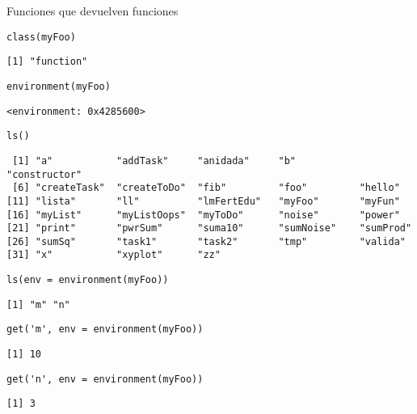 \documentclass[xcolor={usenames,svgnames,dvipsnames}]{beamer}
\begin{document}
\begin{frame}[fragile,label={sec:orgheadline18}]{Funciones que devuelven funciones}
 \lstset{language=R,label= ,caption= ,captionpos=b,numbers=none}
\begin{lstlisting}
class(myFoo)
\end{lstlisting}

\begin{verbatim}
[1] "function"
\end{verbatim}

\lstset{language=R,label= ,caption= ,captionpos=b,numbers=none}
\begin{lstlisting}
environment(myFoo)
\end{lstlisting}

\begin{verbatim}
<environment: 0x4285600>
\end{verbatim}

\lstset{language=R,label= ,caption= ,captionpos=b,numbers=none}
\begin{lstlisting}
ls()
\end{lstlisting}

\begin{verbatim}
 [1] "a"           "addTask"     "anidada"     "b"           "constructor"
 [6] "createTask"  "createToDo"  "fib"         "foo"         "hello"      
[11] "lista"       "ll"          "lmFertEdu"   "myFoo"       "myFun"      
[16] "myList"      "myListOops"  "myToDo"      "noise"       "power"      
[21] "print"       "pwrSum"      "suma10"      "sumNoise"    "sumProd"    
[26] "sumSq"       "task1"       "task2"       "tmp"         "valida"     
[31] "x"           "xyplot"      "zz"
\end{verbatim}

\lstset{language=R,label= ,caption= ,captionpos=b,numbers=none}
\begin{lstlisting}
ls(env = environment(myFoo))
\end{lstlisting}

\begin{verbatim}
[1] "m" "n"
\end{verbatim}

\lstset{language=R,label= ,caption= ,captionpos=b,numbers=none}
\begin{lstlisting}
get('m', env = environment(myFoo))
\end{lstlisting}

\begin{verbatim}
[1] 10
\end{verbatim}

\lstset{language=R,label= ,caption= ,captionpos=b,numbers=none}
\begin{lstlisting}
get('n', env = environment(myFoo))
\end{lstlisting}

\begin{verbatim}
[1] 3
\end{verbatim}
\end{frame}
\end{document}

